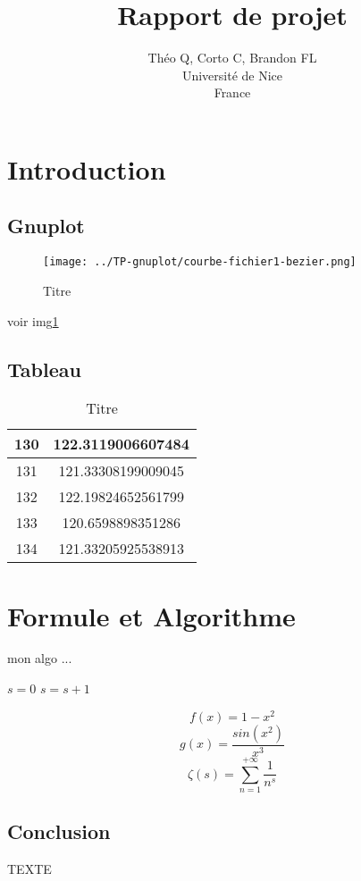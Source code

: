\documentclass{article}
\title{Rapport de projet}
\author{Théo Q, Corto C, Brandon FL \\
Université de Nice\\
France}
\begin{document}
\maketitle


\section{Introduction}



\subsection{Gnuplot}
\begin{figure}[h]
\centering
\texttt{[image: ../TP-gnuplot/courbe-fichier1-bezier.png]} 
\caption{Titre}
\label{fig:toto}
\end{figure}
voir img\ref{fig:toto}

\subsection{Tableau}
\begin{table}[h]
\centering
\begin{tabular}{|c|c|}
\hline 
130 & 122.3119006607484 \\ 
\hline 
131 & 121.33308199009045 \\ 
\hline 
132 & 122.19824652561799 \\ 
\hline 
133 & 120.6598898351286 \\ 
\hline 
134 & 121.33205925538913 \\ 
\hline 
\end{tabular} 
\caption{Titre}
\label{tab:toto2}
\end{table}


\section{Formule et Algorithme}
\begin{algorithm}[H]
\caption{mon algo ...}
\begin{algorithmic}[1]
\STATE $s =0$
\STATE $s= s + 1$
\ENDIF
\ENDFOR
\end{algorithmic}
\end{algorithm}

\begin{equation}
f(x)=1 - x^2
\end{equation}
\begin{equation}
g(x)=\frac{sin(x^2)}{x^3}
\end{equation}
\begin{equation}
\zeta(s)= \sum_{n=1}^{+\infty}\frac1{n^s}
\end{equation}

\subsection{Conclusion}
TEXTE
\end{document}
